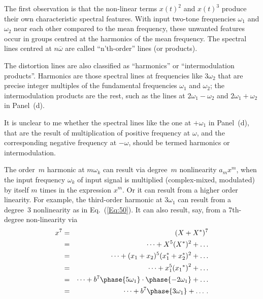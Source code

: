 \documentclass[11pt,oneside,a4paper]{scrartcl}
\newcommand{\Eq}[1]{Eq.~(\ref{Eq:#1})}
\newcommand{\cc}[1]{\ensuremath{{#1}^*}}
\begin{document}
The first observation is that the non-linear terms $x(t)^2$ and $x(t)^3$ produce their own characteristic spectral features. With input two-tone frequencies $\omega_1$ and $\omega_2$ near each other compared to the mean frequency, these unwanted features occur in groups centred at the harmonics of the mean frequency. The spectral lines centred at 
$n\overline \omega$ are called ``n'th-order'' lines (or products). 

The distortion lines are also classified as ``harmonics'' or ``intermodulation products''. Harmonics are those spectral lines at frequencies like $3\omega_2$ that are precise integer multiples of the fundamental frequencies $\omega_1$ and $\omega_2$; the intermodulation products are the rest, such as the lines at 
$2\omega_1-\omega_2$ and $2\omega_1+\omega_2$ in Panel~(d). 

It is unclear to me whether the spectral lines like the one at $+\omega_1$ in Panel~(d), that are the result of multiplication of positive frequency at $\omega$, and the corresponding negative frequency at $-\omega$, should be termed harmonics or intermodulation. 

The order~$m$ harmonic at $m\omega_k$ can result via degree~$m$ nonlinearity $a_m x^m$, when the input frequency $\omega_k$ of input signal is multiplied (complex-mixed, modulated) by itself $m$ times in the expression $x^m$. Or it can result from a higher order linearity. For example, the third-order harmonic at $3\omega_1$ can result from
a degree~3 nonlinearity as in \Eq{50}. It can also result, say, from
a 7th-degree non-linearity via
\begin{eqnarray}
	x^7 &=& (X + \cc X)^7 \nonumber \\
		&=&	\dots + X^5 (\cc X)^2 + \dots \nonumber \\
		&=& \dots + (x_1+x_2)^5(\cc x_1 + \cc x_2)^2 + \dots \nonumber \\
		&=& \dots + x_1^5 {(\cc{x_1})}^2 + \dots \nonumber \\
		&=& \dots + b^7 \phase{5\omega_1} \cdot \phase{-2\omega_1} + \dots \nonumber \\
		&=& \dots + b^7 \phase{3\omega_1} + \dots \,. \label{Eq:60}
\end{eqnarray}
\end{document}
